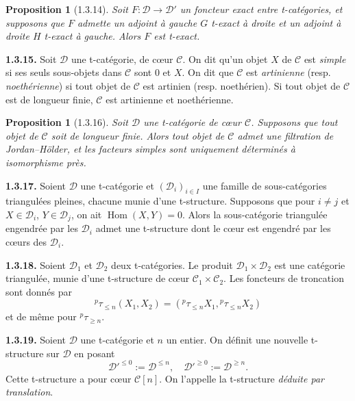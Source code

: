 \documentclass[12pt,a4paper]{article}
\theoremstyle{plain}
\newtheorem{proposition}[theorem]{Proposition}
\theoremstyle{definition}
\theoremstyle{remark}
\DeclareMathOperator{\Hom}{Hom}
\newcommand{\cC}{\mathcal{C}}
\newcommand{\cD}{\mathcal{D}}
\begin{document}
\smallskip

\begin{proposition}[1.3.14]
Soit $F : \cD \to \cD'$ un foncteur exact entre t-catégories, et supposons que $F$ admette un adjoint à gauche $G$ t-exact à droite et un adjoint à droite $H$ t-exact à gauche. Alors $F$ est t-exact.
\end{proposition}

\smallskip

\noindent
\textbf{1.3.15.} Soit $\cD$ une t-catégorie, de cœur $\cC$. On dit qu'un objet $X$ de $\cC$ est \emph{simple} si ses seuls sous-objets dans $\cC$ sont $0$ et $X$. On dit que $\cC$ est \emph{artinienne} (resp. \emph{noethérienne}) si tout objet de $\cC$ est artinien (resp. noethérien). Si tout objet de $\cC$ est de longueur finie, $\cC$ est artinienne et noethérienne.

\smallskip

\begin{proposition}[1.3.16]
Soit $\cD$ une t-catégorie de cœur $\cC$. Supposons que tout objet de $\cC$ soit de longueur finie. Alors tout objet de $\cC$ admet une filtration de Jordan--Hölder, et les facteurs simples sont uniquement déterminés à isomorphisme près.
\end{proposition}

\smallskip

\noindent
\textbf{1.3.17.} Soient $\cD$ une t-catégorie et $(\cD_{i})_{i \in I}$ une famille de sous-catégories triangulées pleines, chacune munie d'une t-structure. Supposons que pour $i \neq j$ et $X \in \cD_{i}$, $Y \in \cD_{j}$, on ait $\Hom(X, Y) = 0$. Alors la sous-catégorie triangulée engendrée par les $\cD_{i}$ admet une t-structure dont le cœur est engendré par les cœurs des $\cD_{i}$.

\smallskip

\noindent
\textbf{1.3.18.} Soient $\cD_{1}$ et $\cD_{2}$ deux t-catégories. Le produit $\cD_{1} \times \cD_{2}$ est une catégorie triangulée, munie d'une t-structure de cœur $\cC_{1} \times \cC_{2}$. Les foncteurs de troncation sont donnés par
\[
{}^{p}\tau_{\leq n}(X_{1}, X_{2}) = ({}^{p}\tau_{\leq n}X_{1}, {}^{p}\tau_{\leq n}X_{2})
\]
et de même pour ${}^{p}\tau_{\geq n}$.

\smallskip

\noindent
\textbf{1.3.19.} Soient $\cD$ une t-catégorie et $n$ un entier. On définit une nouvelle t-structure sur $\cD$ en posant
\[
\cD'^{\leq 0} := \cD^{\leq n}, \quad \cD'^{\geq 0} := \cD^{\geq n}.
\]
Cette t-structure a pour cœur $\cC[n]$. On l'appelle la t-structure \emph{déduite par translation}.
\end{document}
